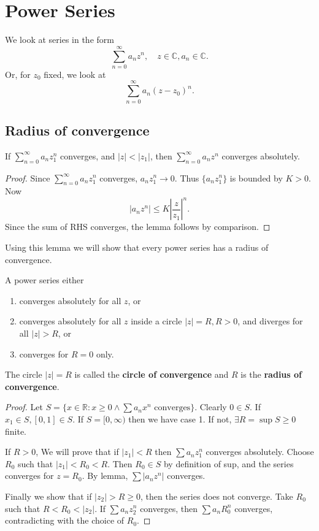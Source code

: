 \section{Power Series}
We look at series in the form 
\[
    \sum_{n=0}^{\infty} a_nz^n,\quad z\in \mathbb{C}, a_n\in \mathbb{C}.
\]
Or, for $ z_0 $ fixed, we look at 
\[
    \sum_{n=0}^{\infty} a_n(z-z_0)^n.
\]
\subsection{Radius of convergence}
\begin{lemma}
    If $ \sum_{n=0}^{\infty} a_n z_1^n$ converges, and $ |z|<|z_1| $, then $ \sum_{n=0}^{\infty} a_n z^n $ converges absolutely.
\end{lemma}
\begin{proof}
    Since $ \sum_{n=0}^{\infty} a_n z_1^n$ converges, $a_nz_1^n\to 0$. Thus $ \{a_nz_1^n\} $ is bounded by $K>0$. Now 
    \[
        \left| a_nz^n \right| \le K \left| \frac{z}{z_1} \right| ^n.
    \]
    Since the sum of RHS converges, the lemma follows by comparison.
\end{proof}
Using this lemma we will show that every power series has a radius of convergence.
\begin{theorem}\label{thm:4.2}
    A power series either
    \begin{enumerate}
        \item converges absolutely for all $z$, or
        \item converges absolutely for all $z$ inside a circle $ |z|=R, R> 0 $, and diverges for all $ |z|>R $, or 
        \item converges for $R=0$ only.
    \end{enumerate}
\end{theorem}
\begin{definition}
    The circle $ |z|=R $ is called the \textbf{circle of convergence} and $R$ is the \textbf{radius of convergence}.
\end{definition}
\begin{proof}
    Let $ S = \{x\in \mathbb{R}: x\ge 0 \land \sum a_n x^n \text{ converges}\} $. Clearly $0\in S$. If $ x_1\in S, [0,1]\in S $. If $ S=[0,\infty) $ then we have case 1. If not, $ \exists R = \sup S \ge 0 $ finite.

    If $ R>0 $, We will prove that if $ |z_1|<R $ then $ \sum a_nz_1^n $ converges absolutely. Choose $ R_0 $ such that $ |z_1|<R_0<R $. Then $ R_0\in S $ by definition of sup, and the series converges for $ z=R_0 $. By lemma, $ \sum |a_n z^n| $ converges.

    Finally we show that if $ |z_2|>R\ge 0 $, then the series does not converge. Take $ R_0 $ such that $ R<R_0<|z_2| $. If $ \sum a_nz_2^n $ converges, then $ \sum a_n R_0^n $ converges, contradicting with the choice of $R_0$.
\end{proof}

